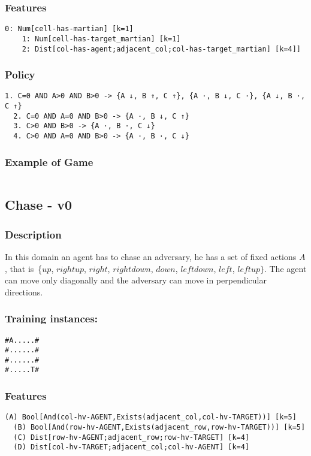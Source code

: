 \documentclass[a4paper]{article}
\begin{document}
\subsubsection{Features}
\begin{Verbatim}[fontsize=\footnotesize]
  0: Num[cell-has-martian] [k=1]
	1: Num[cell-has-target_martian] [k=1]
	2: Dist[col-has-agent;adjacent_col;col-has-target_martian] [k=4]]
\end{Verbatim}

\subsubsection{Policy}
\begin{Verbatim}[fontsize=\footnotesize]
  1. C=0 AND A>0 AND B>0 -> {A ↓, B ↑, C ↑}, {A ·, B ↓, C ·}, {A ↓, B ·, C ↑}
  2. C=0 AND A=0 AND B>0 -> {A ·, B ↓, C ↑}
  3. C>0 AND B>0 -> {A ·, B ·, C ↓}
  4. C>0 AND A=0 AND B>0 -> {A ·, B ·, C ↓}
\end{Verbatim}

\subsubsection{Example of Game}
\begin{Verbatim}[fontsize=\footnotesize]

\end{Verbatim}


\subsection{Chase - v0}
\subsubsection{Description}
In this domain an agent has to chase an adversary, he has a set of fixed actions $A$, that is~\{$up$, $rightup$, $right$, $rightdown$, $down$, $leftdown$, $left$, $leftup\}$. The agent can move only diagonally and the adversary can move in perpendicular directions.

\subsubsection{Training instances:}
\begin{Verbatim}[fontsize=\footnotesize]
#A.....#
#......#
#......#
#.....T#
\end{Verbatim}

\subsubsection{Features}
\begin{Verbatim}[fontsize=\footnotesize]
  (A) Bool[And(col-hv-AGENT,Exists(adjacent_col,col-hv-TARGET))] [k=5]
  (B) Bool[And(row-hv-AGENT,Exists(adjacent_row,row-hv-TARGET))] [k=5]
  (C) Dist[row-hv-AGENT;adjacent_row;row-hv-TARGET] [k=4]
  (D) Dist[col-hv-TARGET;adjacent_col;col-hv-AGENT] [k=4]
\end{Verbatim}
\end{document}
